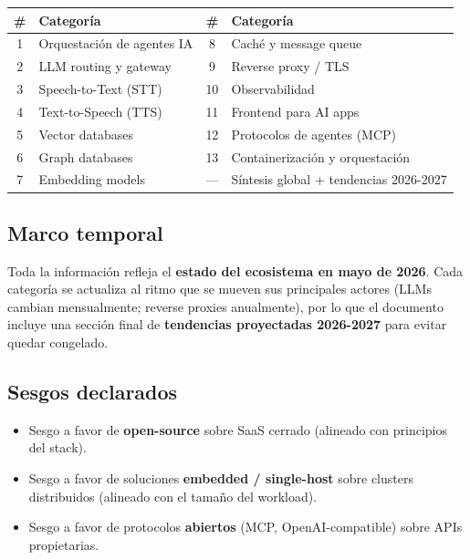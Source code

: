 \documentclass[11pt,a4paper]{article}
\begin{document}
\begin{center}
\begin{tabular}{|c|l|c|l|}
\hline
\rowcolor{sotared}\color{white}\textbf{\#} & \color{white}\textbf{Categoría} & \color{white}\textbf{\#} & \color{white}\textbf{Categoría}\\
\hline
1 & Orquestación de agentes IA & 8 & Caché y message queue\\
2 & LLM routing y gateway & 9 & Reverse proxy / TLS\\
3 & Speech-to-Text (STT) & 10 & Observabilidad\\
4 & Text-to-Speech (TTS) & 11 & Frontend para AI apps\\
5 & Vector databases & 12 & Protocolos de agentes (MCP)\\
6 & Graph databases & 13 & Containerización y orquestación\\
7 & Embedding models & — & Síntesis global + tendencias 2026-2027\\
\hline
\end{tabular}
\end{center}

\subsection{Marco temporal}

Toda la información refleja el \textbf{estado del ecosistema en mayo de 2026}. Cada categoría se actualiza al ritmo que se mueven sus principales actores (LLMs cambian mensualmente; reverse proxies anualmente), por lo que el documento incluye una sección final de \textbf{tendencias proyectadas 2026-2027} para evitar quedar congelado.

\subsection{Sesgos declarados}

\begin{itemize}[leftmargin=*,itemsep=1pt]
\item Sesgo a favor de \textbf{open-source} sobre SaaS cerrado (alineado con principios del stack).
\item Sesgo a favor de soluciones \textbf{embedded / single-host} sobre clusters distribuidos (alineado con el tamaño del workload).
\item Sesgo a favor de protocolos \textbf{abiertos} (MCP, OpenAI-compatible) sobre APIs propietarias.
\end{itemize}
\end{document}
